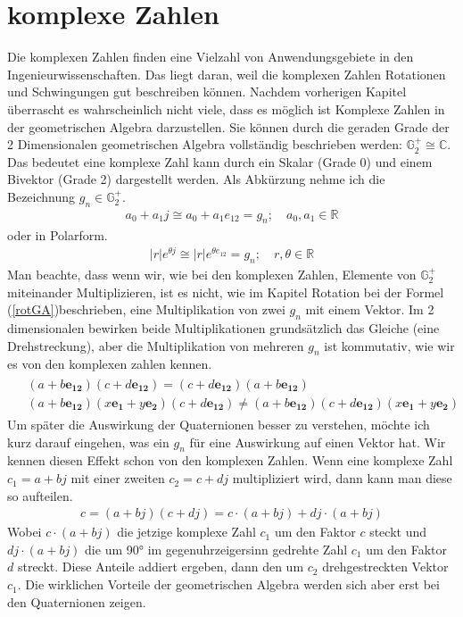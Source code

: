 %
%
%
\section{komplexe Zahlen}
Die komplexen Zahlen finden eine Vielzahl von Anwendungsgebiete in den Ingenieurwissenschaften. Das liegt daran, weil die komplexen Zahlen Rotationen und Schwingungen gut beschreiben können. Nachdem vorherigen Kapitel überrascht es wahrscheinlich nicht viele, dass es möglich ist Komplexe Zahlen in der geometrischen Algebra darzustellen. Sie können durch die geraden Grade der 2 Dimensionalen geometrischen Algebra vollständig beschrieben werden: $\mathbb{G}_2^+ \cong \mathbb{C}$. Das bedeutet eine komplexe Zahl kann durch ein Skalar (Grade 0) und einem Bivektor (Grade 2) dargestellt werden. Als Abkürzung nehme ich die Bezeichnung $g_n \in  \mathbb{G}_2^+$.
\begin{align}
	a_0 + a_1 j \cong a_0 + a_1 e_{12} = g_n;\quad a_0, a_1 \in \mathbb{R}
\end{align}
oder in Polarform.
\begin{align}
	|r|e^{\theta j} \cong |r|e^{\theta e_{12}} = g_n; \quad r, \theta \in \mathbb{R}
\end{align}
Man beachte, dass wenn wir, wie bei den komplexen Zahlen, Elemente von $\mathbb{G}_2^+$ miteinander Multiplizieren, ist es nicht, wie im Kapitel Rotation bei der Formel (\ref{rotGA})beschrieben, eine Multiplikation von zwei $g_n$ mit einem Vektor. Im 2 dimensionalen bewirken beide Multiplikationen grundsätzlich das Gleiche (eine Drehstreckung), aber die Multiplikation von mehreren $g_n$ ist kommutativ, wie wir es von den komplexen zahlen kennen.
\begin{align}
	\begin{split}
		&(a + b \mathbf{e_{12}})(c + d \mathbf{e_{12}}) = (c + d \mathbf{e_{12}})(a + b \mathbf{e_{12}})\\
		&(a + b \mathbf{e_{12}})(x\mathbf{e_1}+y\mathbf{e_2})(c + d \mathbf{e_{12}}) \not= (a + b \mathbf{e_{12}})(c + d \mathbf{e_{12}})(x\mathbf{e_1}+y\mathbf{e_2})
	\end{split}
\end{align}
Um später die Auswirkung der Quaternionen besser zu verstehen, möchte ich kurz darauf eingehen, was ein $g_n$ für eine Auswirkung auf einen Vektor hat.
Wir kennen diesen Effekt schon von den komplexen Zahlen. Wenn eine komplexe Zahl $c_1=a+bj$ mit einer zweiten $c_2=c+dj$ multipliziert wird, dann kann man diese so aufteilen.
\begin{align}
	c = (a + bj)(c + dj) = c\cdot(a+bj) + dj\cdot(a+bj)
\end{align}
Wobei $c\cdot(a+bj)$ die jetzige komplexe Zahl $c_1$ um den Faktor $c$ steckt und $dj\cdot(a+bj)$ die um 90° im gegenuhrzeigersinn gedrehte Zahl $c_1$ um den Faktor $d$ streckt. Diese Anteile addiert ergeben, dann den um $c_2$ drehgestreckten Vektor $c_1$. Die wirklichen Vorteile der geometrischen Algebra werden sich aber erst bei den Quaternionen zeigen.
